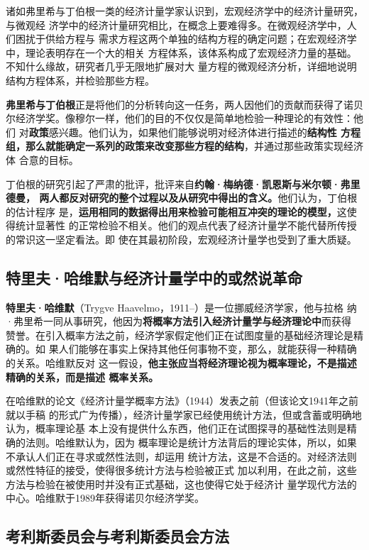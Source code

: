 诸如弗里希与丁伯根一类的经济计量学家认识到，宏观经济学中的经济计量研究，与微观经
济学中的经济计量研究相比，在概念上要难得多。在微观经济学中，人们困扰于供给方程与
需求方程这两个单独的结构方程的确定问题；在宏观经济学中，理论表明存在一个大的相关
方程体系，该体系构成了宏观经济力量的基础。不知什么缘故，研究者几乎无限地扩展对大
量方程的微观经济分析，详细地说明结构方程体系，并检验那些方程。

\textbf{弗里希与丁伯根}正是将他们的分析转向这一任务，两人因他们的贡献而获得了诺贝
尔经济学奖。像穆尔一样，他们的目的不仅仅是简单地检验一种理论的有效性：他们
对\textbf{政策}感兴趣。他们认为，如果他们能够说明对经济体进行描述的\textbf{结构性
  方程组，那么就能确定一系列的政策来改变那些方程的结构}，并通过那些政策实现经济体
合意的目标。

丁伯根的研究引起了严肃的批评，批评来自\textbf{约翰·梅纳德·凯恩斯与米尔顿·弗里德曼，
  两人都反对研究的整个过程以及从研究中得出的含义。}他们认为，丁伯根的估计程序
是，\textbf{运用相同的数据得出用来检验可能相互冲突的理论的模型，}这使得统计显著性
的正常检验不相关。他们的观点代表了经济计量学不能代替所传授的常识这一坚定看法。即
使在其最初阶段，宏观经济计量学也受到了重大质疑。

\subsection{特里夫·哈维默与经济计量学中的或然说革命}

\textbf{特里夫·哈维默}（Trygve Haavelmo，1911--）是一位挪威经济学家，他与拉格
纳·弗里希一同从事研究，他因为\textbf{将概率方法引入经济计量学与经济理论中}而获得
赞誉。在引入概率方法之前，经济学家假定他们正在试图度量的基础经济理论是精确的。如
果人们能够在事实上保持其他任何事物不变，那么，就能获得一种精确的关系。哈维默反对
这一假设，\textbf{他主张应当将经济理论视为概率理论，不是描述精确的关系，而是描述
  概率关系。}

在哈维默的论文《经济计量学概率方法》（1944）发表之前（但该论文1941年之前就以手稿
的形式广为传播），经济计量学家已经使用统计方法，但或含蓄或明确地认为，概率理论基
本上没有提供什么东西，他们正在试图探寻的基础性法则是精确的法则。哈维默认为，因为
概率理论是统计方法背后的理论实体，所以，如果不承认人们正在寻求或然性法则，却运用
统计方法，这是不合适的。对经济法则或然性特征的接受，使得很多统计方法与检验被正式
加以利用，在此之前，这些方法与检验在被使用时并没有正式基础，这也使得它处于经济计
量学现代方法的中心。哈维默于1989年获得诺贝尔经济学奖。

\subsection{考利斯委员会与考利斯委员会方法}

